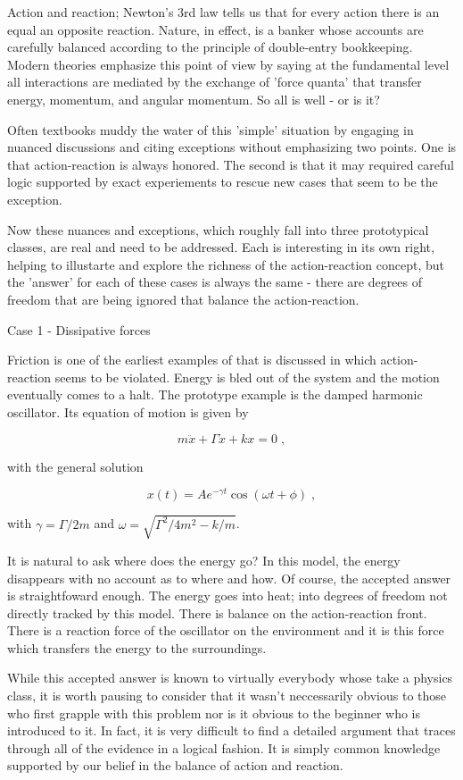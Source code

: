\documentclass[12pt]{article}
\begin{document}
Action and reaction; Newton's 3rd law tells us that for every action there is an equal an opposite reaction.  Nature, in effect, is a banker whose accounts are carefully balanced according to the principle of double-entry bookkeeping.  Modern theories emphasize this point of view by saying at the fundamental level all interactions are mediated by the exchange of 'force quanta' that transfer energy, momentum, and angular momentum.  So all is well - or is it?

Often textbooks muddy the water of this 'simple' situation by engaging in nuanced discussions and citing exceptions without emphasizing two points.  One is that action-reaction is always honored.  The second is that it may required careful logic supported by exact experiements to rescue new cases that seem to be the exception.  

Now these nuances and exceptions, which roughly fall into three prototypical classes, are real and need to be addressed.  Each is interesting in its own right, helping to illustarte and explore the richness of the action-reaction concept, but the 'answer' for each of these cases is always the same - there are degrees of freedom that are being ignored that balance the action-reaction.

Case 1 - Dissipative forces

Friction is one of the earliest examples of that is discussed in which action-reaction seems to be violated.  Energy is bled out of the system and the motion eventually comes to a halt.  The prototype example is the damped harmonic oscillator.  Its equation of motion is given by

\[ m {\ddot x} + \Gamma {\dot x} + k x = 0 \; , \]

with the general solution

\[ x(t) = A e^{-\gamma t} \cos( \omega t + \phi ) \; , \]

with $\gamma = \Gamma/2m$ and $\omega = \sqrt{\Gamma^2/4 m^2 - k/m}$.

It is natural to ask where does the energy go?  In this model, the energy disappears with no account as to where and how.  Of course, the accepted answer is straightfoward enough.  The energy goes into heat; into degrees of freedom not directly tracked by this model.  There is balance on the action-reaction front.  There is a reaction force of the oscillator on the environment and it is this force which transfers the energy to the surroundings.

While this accepted answer is known to virtually everybody whose take a physics class, it is worth pausing to consider that it wasn't neccessarily obvious to those who first grapple with this problem nor is it obvious to the beginner who is introduced to it.  In fact, it is very difficult to find a detailed argument that traces through all of the evidence in a logical fashion.  It is simply common knowledge supported by our belief in the balance of action and reaction.
\end{document}

